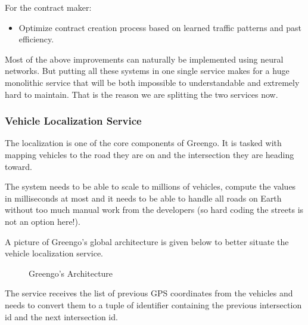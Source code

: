 \documentclass[letterpaper,10pt,english]{sphinxmanual}
\begin{document}
For the contract maker:
\begin{itemize}
\item {} 
Optimize contract creation process based on learned traffic patterns and past efficiency.

\end{itemize}

Most of the above improvements can naturally be implemented using neural networks. But putting all these systems in one single service makes for a huge monolithic service that will be both impossible to understandable and extremely hard to maintain. That is the reason we are splitting the two services now.


\subsubsection{Vehicle Localization Service}
\label{\detokenize{blog/2020/01/vehicle_localization:vehicle-localization-service}}\label{\detokenize{blog/2020/01/vehicle_localization::doc}}
\begin{figure}[htbp]
\centering

\noindent{}
\end{figure}

 The localization is one of the core components of Greengo. It is tasked with mapping vehicles to the road they are on and the intersection they are heading toward.

 The system needs to be able to scale to millions of vehicles, compute the values in milliseconds at most and it needs to be able to handle all roads on Earth without too much manual work from the developers (so hard coding the streets is not an option here!).

 A picture of Greengo’s global architecture is given below to better situate the vehicle localization service.

\begin{figure}[htbp]
\centering
\capstart

\noindent{}
\caption{Greengo’s Architecture}\label{\detokenize{blog/2020/01/vehicle_localization:id1}}\end{figure}

 The service receives the list of previous GPS coordinates from the vehicles and needs to convert them to a tuple of identifier containing the previous intersection id and the next intersection id.
\end{document}
